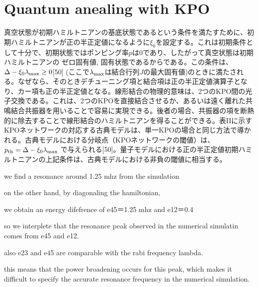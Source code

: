 \section{Quantum anealing with KPO}
真空状態が初期ハミルトニアンの基底状態であるという条件を満たすために、初期ハミルトニアンが正の半正定値になるように$\xi_0$を設定する。これは初期条件として十分で、初期状態ではポンピング率$p$は$0$であり、したがって真空状態は初期ハミルトニアンの ゼロ固有値, 固有状態であるからである。この条件は、$\Delta-\xi_0\lambda_{\rm{max}}\geq0$[50] (ここで$\lambda_{\rm{max}}$は結合行列$J$の最大固有値)のときに満たされる。なぜなら、そのときデチューニング項と結合項は正の半正定値演算子となり、カー項も正の半正定値となる。線形結合の物理的意味は、2つのKPO間の光子交換である。これは、2つのKPOを直接結合させるか、あるいは遠く離れた共鳴結合共振器を用いることで容易に実現できる。後者の場合、共振器の項を断熱的に除去することで線形結合のハミルトニアンを得ることができる。表IIに示すKPOネットワークの対応する古典モデルは、単一KPOの場合と同じ方法で導かれる。古典モデルにおける分岐点（KPOネットワークの閾値）は、$p_{\rm{th}}=\Delta-\xi_0\lambda_{\rm{max}}$ で与えられる[50]。量子モデルにおける正の半正定値初期ハミルトニアンの上記条件は、古典モデルにおける非負の閾値に相当する。



we find a resonance around 1.25 mhz from the simulation


on the other hand, by diagonaling the hamiltonian, 


we obtain an energy difefrence of e45＝1.25 mhz and e12＝0.4

so we interplete that the resonance peak observed in the numerical simulatin comes from e45 and e12.

also e23 and e45 are comparable with the rabi frequency lambda.

this means that the power broadening occurs for this peak, which makes it difficult to specify the accurate resonance frequency in the numerical simulation.


